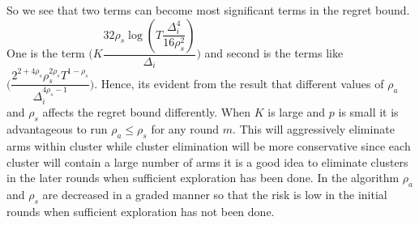 \begin{remark}
	So we see that two terms can become most significant terms in the regret bound. One is the term  $\bigg(K\dfrac{32\rho_{s}\log{(T\dfrac{\Delta_{i}^{4}}{16\rho_{s}^{2}})}}{\Delta_{i}}\bigg)$ and second is the terms like $\bigg(\dfrac{2^{2+4\rho_{s}}\rho_{s}^{2\rho_{s}}T^{1-\rho_{s}}}{\Delta_{i}^{4\rho_{s}-1}}\bigg)$. Hence, its evident from the result that different values of $\rho_{a}$ and $\rho_{s}$ affects the regret bound differently. When $K$ is large and $p$ is small it is advantageous to run $\rho_{a}\leq \rho_{s}$ for any round $m$. This will aggressively eliminate arms within cluster while cluster elimination will be more conservative since each cluster will contain a large number of arms it is a good idea to eliminate clusters in the later rounds when sufficient exploration has been done. In the algorithm $\rho_{a}$ and $\rho_{s}$ are decreased in a graded manner so that the risk is low in the initial rounds when sufficient exploration has not been done.
	
\end{remark}

